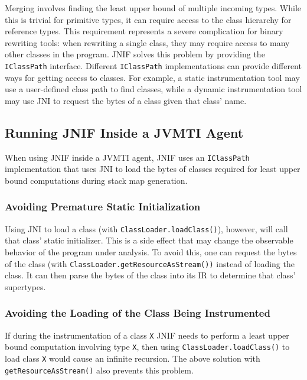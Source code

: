 Merging involves finding the least upper bound of multiple incoming types.
While this is trivial for primitive types,
it can require access to the class hierarchy for reference types.
This requirement represents a severe complication for binary rewriting tools:
when rewriting a single class, they may require access to many other classes in the program.
JNIF solves this problem by providing the \texttt{IClassPath} interface.
Different \texttt{IClassPath} implementations can provide different ways for getting access to classes.
For example, a static instrumentation tool may use a user-defined class path to find classes,
while a dynamic instrumentation tool may use JNI to request the bytes of a class given that class' name.




\subsection{Running JNIF Inside a JVMTI Agent}
When using JNIF inside a JVMTI agent, 
JNIF uses an \texttt{IClassPath} implementation
that uses JNI to load the bytes of classes
required for least upper bound computations during stack map generation.


\subsubsection*{Avoiding Premature Static Initialization}
Using JNI to load a class (with \texttt{ClassLoader.loadClass()}), however, will call that class' static initializer.
This is a side effect that may change the observable behavior of the program under analysis.
To avoid this, one can request the bytes of the class (with \texttt{ClassLoader.getResourceAsStream())} instead of loading the class.
It can then parse the bytes of the class into its IR to determine that class' supertypes.


\subsubsection*{Avoiding the Loading of the Class Being Instrumented}
If during the instrumentation of a class \texttt{X} 
JNIF needs to perform a least upper bound computation involving type \texttt{X},
then using \texttt{ClassLoader.loadClass()} to load class \texttt{X} would cause an infinite recursion.
The above solution with \texttt{getResourceAsStream()} also prevents this problem.


